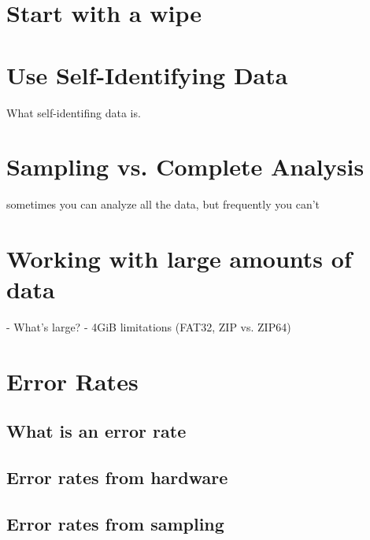 \section{Start with a wipe}
\section{Use Self-Identifying Data}

What self-identifing data is.



\section{Sampling vs. Complete Analysis}

sometimes you can analyze all the data, but frequently you can't

\section{Working with large amounts of data}
 - What's large?
 - 4GiB limitations (FAT32, ZIP vs. ZIP64)
\section{Error Rates}
\subsection{What is an error rate}
\subsection{Error rates from hardware}
\subsection{Error rates from sampling}

